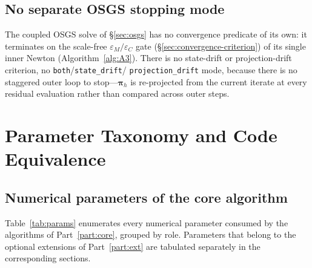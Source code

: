 \documentclass{article}
\newcommand{\code}[1]{\texttt{\small #1}}
\begin{document}
\subsection{No separate OSGS stopping mode}

The coupled OSGS solve of §\ref{sec:osgs} has no convergence predicate
of its own: it terminates on the scale-free $\varepsilon_M/\varepsilon_C$
gate (§\ref{sec:convergence-criterion}) of its single inner Newton (Algorithm~\ref{alg:A3}). There is no
state-drift or projection-drift criterion, no \code{both}/\code{state\_drift}/%
\code{projection\_drift} mode, because there is no staggered outer loop
to stop---$\boldsymbol{\pi}_h$ is re-projected from the current iterate
at every residual evaluation rather than compared across outer steps.

\section{Parameter Taxonomy and Code Equivalence}
\label{sec:params}

\subsection{Numerical parameters of the core algorithm}

Table~\ref{tab:params} enumerates every numerical parameter consumed by
the algorithms of Part~\ref{part:core}, grouped by role. Parameters
that belong to the optional extensions of Part~\ref{part:ext} are
tabulated separately in the corresponding sections.
\end{document}

